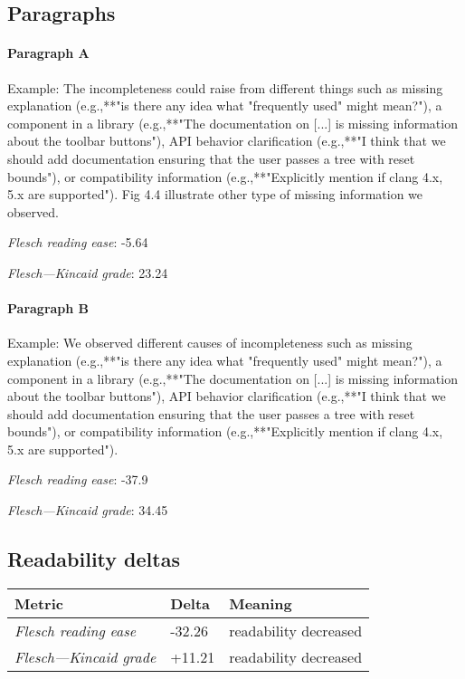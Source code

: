 \subsection{Paragraphs}
\paragraph{Paragraph A}
Example: The incompleteness could raise from different things such as missing explanation (e.g.,**"is there any idea what "frequently used" might mean?"), a component in a library (e.g.,**"The documentation on [...] is missing information about the toolbar buttons"), API behavior clarification (e.g.,**"I think that we should add documentation ensuring that the user passes a tree with reset bounds"), or compatibility information (e.g.,**"Explicitly mention if clang 4.x, 5.x are supported"). Fig 4.4 illustrate other type of missing information we observed.\par\medskip
\emph{Flesch reading ease}: -5.64\par
\emph{Flesch---Kincaid grade}: 23.24

\paragraph{Paragraph B}
Example: We observed different causes of incompleteness such as missing explanation (e.g.,**"is there any idea what "frequently used" might mean?"), a component in a library (e.g.,**"The documentation on [...] is missing information about the toolbar buttons"), API behavior clarification (e.g.,**"I think that we should add documentation ensuring that the user passes a tree with reset bounds"), or compatibility information (e.g.,**"Explicitly mention if clang 4.x, 5.x are supported").\par\medskip
\emph{Flesch reading ease}: -37.9\par
\emph{Flesch---Kincaid grade}: 34.45

\subsection{Readability deltas}

\begin{tabular}{lll}
\toprule
               \textbf{Metric} & \textbf{Delta} &       \textbf{Meaning} \\
\midrule
    \emph{Flesch reading ease} &         -32.26 &  readability decreased \\
 \emph{Flesch---Kincaid grade} &         +11.21 &  readability decreased \\
\bottomrule
\end{tabular}

